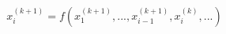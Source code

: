 \documentclass[preview]{standalone}
\begin{document}
\begin{align*}
x_i^{(k+1)} = f(x_1^{(k+1)}, ..., x_{i-1}^{(k+1)}, x_i^{(k)}, ...)
\end{align*}
\end{document}
